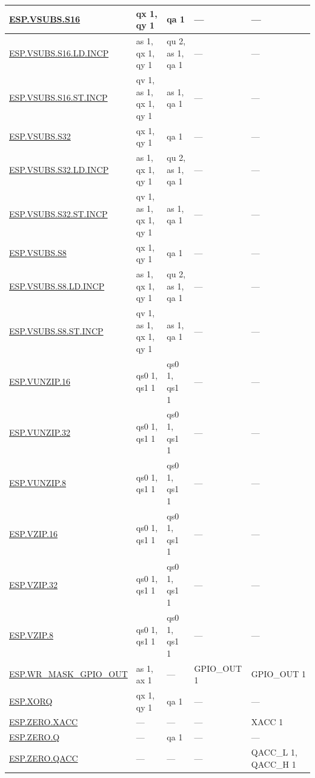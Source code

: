 \begin{longtable}[c]{|l|m{2.5cm}|m{2.5cm}|m{2.5cm}|m{2.5cm}|}
    \hyperref[instruction:ESPVSUBSS16]{ESP.VSUBS.S16} & qx 1, qy 1 & qa 1 & — & — \\\hline
    \hyperref[instruction:ESPVSUBSS16LDINCP]{ESP.VSUBS.S16.LD.INCP} & as 1, qx 1, qy 1 & qu 2, as 1, qa 1 & — & — \\\hline
    \hyperref[instruction:ESPVSUBSS16STINCP]{ESP.VSUBS.S16.ST.INCP} & qv 1, as 1, qx 1, qy 1 & as 1, qa 1 & — & — \\\hline
    \hyperref[instruction:ESPVSUBSS32]{ESP.VSUBS.S32} & qx 1, qy 1 & qa 1 & — & — \\\hline
    \hyperref[instruction:ESPVSUBSS32LDINCP]{ESP.VSUBS.S32.LD.INCP} & as 1, qx 1, qy 1 & qu 2, as 1, qa 1 & — & — \\\hline
    \hyperref[instruction:ESPVSUBSS32STINCP]{ESP.VSUBS.S32.ST.INCP} & qv 1, as 1, qx 1, qy 1 & as 1, qa 1 & — & — \\\hline
    \hyperref[instruction:ESPVSUBSS8]{ESP.VSUBS.S8} & qx 1, qy 1 & qa 1 & — & — \\\hline
    \hyperref[instruction:ESPVSUBSS8LDINCP]{ESP.VSUBS.S8.LD.INCP} & as 1, qx 1, qy 1 & qu 2, as 1, qa 1 & — & — \\\hline
    \hyperref[instruction:ESPVSUBSS8STINCP]{ESP.VSUBS.S8.ST.INCP} & qv 1, as 1, qx 1, qy 1 & as 1, qa 1 & — & — \\\hline
    \hyperref[instruction:ESPVUNZIP16]{ESP.VUNZIP.16} & qs0 1, qs1 1 & qs0 1, qs1 1 & — & — \\\hline
    \hyperref[instruction:ESPVUNZIP32]{ESP.VUNZIP.32} & qs0 1, qs1 1 & qs0 1, qs1 1 & — & — \\\hline
    \hyperref[instruction:ESPVUNZIP8]{ESP.VUNZIP.8} & qs0 1, qs1 1 & qs0 1, qs1 1 & — & — \\\hline
    \hyperref[instruction:ESPVZIP16]{ESP.VZIP.16} & qs0 1, qs1 1 & qs0 1, qs1 1 & — & — \\\hline
    \hyperref[instruction:ESPVZIP32]{ESP.VZIP.32} & qs0 1, qs1 1 & qs0 1, qs1 1 & — & — \\\hline
    \hyperref[instruction:ESPVZIP8]{ESP.VZIP.8} & qs0 1, qs1 1 & qs0 1, qs1 1 & — & — \\\hline
    \hyperref[instruction:ESPWRMASKGPIOOUT]{ESP.WR\_MASK\_GPIO\_OUT} & as 1, ax 1 & — & GPIO\_OUT 1 & GPIO\_OUT 1 \\\hline
    \hyperref[instruction:ESPXORQ]{ESP.XORQ} & qx 1, qy 1 & qa 1 & — & — \\\hline
    \hyperref[instruction:ESPZEROXACC]{ESP.ZERO.XACC} & — & — & — & XACC 1\\\hline
    \hyperref[instruction:ESPZEROQ]{ESP.ZERO.Q} & — & qa 1 & — & — \\\hline
    \hyperref[instruction:ESPZEROQACC]{ESP.ZERO.QACC} & — & — & — & QACC\_L 1, QACC\_H 1\\\hline
\end{longtable}